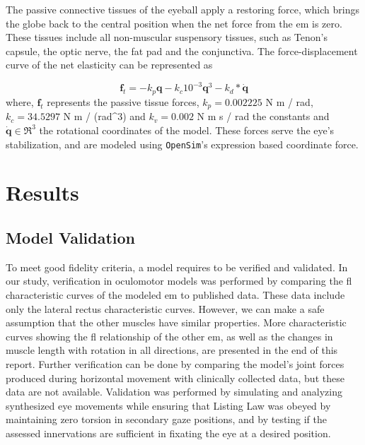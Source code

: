 \documentclass[11pt,a4paper,draft=false]{report}
\renewcommand*{\vec}[1]{\bm{#1}}
\newcommand{\R}[1]{\mathfrak{R}^{#1}}
\newcommand{\inr}[1]{\in\R{#1}}
\begin{document}
The passive connective tissues of the eyeball apply a restoring force, which
brings the globe back to the central position when the net force from the
\gls{em} is zero. These tissues include all non-muscular suspensory tissues,
such as Tenon’s capsule, the optic nerve, the fat pad and the conjunctiva. The
force-displacement curve of the net elasticity can be represented as

\begin{equation}\label{equ:passive-tissue}
  \vec{f}_t = -k_p \vec{q} - k_c 10^{-3} \vec{q}^3 - k_d * \vec{\dot{q}}
\end{equation}
% 
where, $\vec{f}_t$ represents the passive tissue forces, $k_p= 0.002225$ N m /
rad, $k_c= 34.5297$ N m / (rad^3) and $k_v= 0.002$ N m s / rad the constants and
$\vec{\dot{q}} \inr{3}$ the rotational coordinates of the model. These forces
serve the eye’s stabilization, and are modeled using \texttt{OpenSim}'s
expression based coordinate force.

\section*{Results}\label{sec:results}

\subsection*{Model Validation}\label{sec:model-validation}

To meet good fidelity criteria, a model requires to be verified and
validated. In our study, verification in oculomotor models was performed by
comparing the \gls{fl} characteristic curves of the modeled \gls{em} to
published data. These data include only the lateral rectus characteristic
curves. However, we can make a safe assumption that the other muscles have
similar properties. More characteristic curves showing the \gls{fl} relationship
of the other \gls{em}, as well as the changes in muscle length with rotation in
all directions, are presented in the end of this report. Further verification
can be done by comparing the model’s joint forces produced during horizontal
movement with clinically collected data, but these data are not available.
Validation was performed by simulating and analyzing synthesized eye movements
while ensuring that Listing Law was obeyed by maintaining zero torsion in
secondary gaze positions, and by testing if the assessed innervations are
sufficient in fixating the eye at a desired position.
\end{document}
